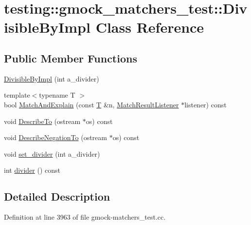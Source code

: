 \hypertarget{classtesting_1_1gmock__matchers__test_1_1_divisible_by_impl}{}\section{testing\+:\+:gmock\+\_\+matchers\+\_\+test\+:\+:Divisible\+By\+Impl Class Reference}
\label{classtesting_1_1gmock__matchers__test_1_1_divisible_by_impl}
\subsection*{Public Member Functions}
\begin{DoxyCompactItemize}
\item 
\hyperlink{classtesting_1_1gmock__matchers__test_1_1_divisible_by_impl_aab5d8d383a8cbf112fe087c4f0f3f699}{Divisible\+By\+Impl} (int a\+\_\+divider)
\item 
{\footnotesize template$<$typename T $>$ }\\bool \hyperlink{classtesting_1_1gmock__matchers__test_1_1_divisible_by_impl_a7f2368362416d0e527f6ac0790003d69}{Match\+And\+Explain} (const \hyperlink{functions__7_8js_adf1f3edb9115acb0a1e04209b7a9937b}{T} \&n, \hyperlink{classtesting_1_1_match_result_listener}{Match\+Result\+Listener} $\ast$listener) const 
\item 
void \hyperlink{classtesting_1_1gmock__matchers__test_1_1_divisible_by_impl_a6dd6430816067c5f787eb2e722c59181}{Describe\+To} (ostream $\ast$os) const 
\item 
void \hyperlink{classtesting_1_1gmock__matchers__test_1_1_divisible_by_impl_a92e618b858b39fa72b1e4a3766956884}{Describe\+Negation\+To} (ostream $\ast$os) const 
\item 
void \hyperlink{classtesting_1_1gmock__matchers__test_1_1_divisible_by_impl_a86c8787ab835bc84a9ad7e3931d644cc}{set\+\_\+divider} (int a\+\_\+divider)
\item 
int \hyperlink{classtesting_1_1gmock__matchers__test_1_1_divisible_by_impl_ac1ecf78ff1aacb98ced9eb90185e2f75}{divider} () const 
\end{DoxyCompactItemize}


\subsection{Detailed Description}


Definition at line 3963 of file gmock-\/matchers\+\_\+test.\+cc.



